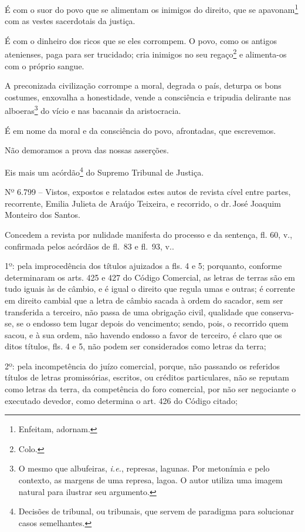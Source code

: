 É com o suor do povo que se alimentam os inimigos do direito, que se
apavonam\footnote{Enfeitam, adornam.} com as vestes sacerdotais da
justiça.

É com o dinheiro dos ricos que se eles corrompem. O povo, como os
antigos atenienses, paga para ser trucidado; cria inimigos no seu
regaço\footnote{Colo.} e alimenta-os com o próprio sangue.

A preconizada civilização corrompe a moral, degrada o país, deturpa os
bons costumes, enxovalha a honestidade, vende a consciência e tripudia
delirante nas alboeras\footnote{ O mesmo que albufeiras,
  \emph{i.e.}, represas, lagunas. Por metonímia e pelo contexto, as
  margens de uma represa, lagoa. O autor utiliza uma imagem natural para
  ilustrar seu argumento.} do vício e nas bacanais da aristocracia.

É em nome da moral e da consciência do povo, afrontadas, que escrevemos.

Não demoramos a prova das nossas asserções.

Eis mais um acórdão\footnote{Decisões de tribunal, ou tribunais, que
  servem de paradigma para solucionar casos semelhantes.} do Supremo
Tribunal de Justiça.

Nº 6.799 -- Vistos, expostos e relatados estes autos de revista cível
entre partes, recorrente, Emilia Julieta de Araújo Teixeira, e
recorrido, o dr.\,José Joaquim Monteiro dos Santos.

Concedem a revista por nulidade manifesta do processo e da sentença, fl.
60, v., confirmada pelos acórdãos de fl.~83 e fl.~93, v..

1º: pela improcedência dos títulos ajuizados a fls. 4 e 5; porquanto,
conforme determinaram os arts. 425 e 427 do Código Comercial, as letras
de terras são em tudo iguais às de câmbio, e é igual o direito que
regula umas e outras; é corrente em direito cambial que a letra de
câmbio sacada à ordem do sacador, sem ser transferida a terceiro, não
passa de uma obrigação civil, qualidade que conserva-se, se o endosso
tem lugar depois do vencimento; sendo, pois, o recorrido quem sacou, e à
sua ordem, não havendo endosso a favor de terceiro, é claro que os ditos
títulos, fls. 4 e 5, não podem ser considerados como letras da terra;

2º: pela incompetência do juízo comercial, porque, não passando os
referidos títulos de letras promissórias, escritos, ou créditos
particulares, não se reputam como letras da terra, da competência do
foro comercial, por não ser negociante o executado devedor, como
determina o art. 426 do Código citado;

